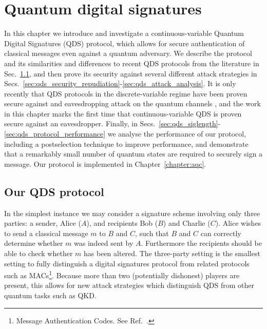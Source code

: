 %

\chapter{Quantum digital signatures}\label{chapter:qds}


In this chapter we introduce and investigate a continuous-variable Quantum Digital Signatures (QDS) protocol, which allows for secure authentication of classical messages even against a quantum adversary. We describe the protocol and its similarities and differences to recent QDS protocols from the literature in Sec.~\ref{sec:qds_protocol}, and then prove its security against several different attack strategies in Secs.~\ref{sec:qds_security_repudiation}-\ref{sec:qds_attack_analysis}. It is only recently that QDS protocols in the discrete-variable regime have been proven secure against and eavesdropping attack on the quantum channels \cite{Amiri2016, Yin2016}, and the work in this chapter marks the first time that continuous-variable QDS is proven secure against an eavesdropper. Finally, in Secs.~\ref{sec:qds_siglength}-\ref{sec:qds_protocol_performance} we analyse the performance of our protocol, including a postselection technique to improve performance, and demonstrate that a remarkably small number of quantum states are required to securely sign a message. Our protocol is implemented in Chapter~\ref{chapter:aqc}.

\section{Our QDS protocol}\label{sec:qds_protocol}

In the simplest instance we may consider a signature scheme involving only three parties: a sender, Alice ($A$), and recipients Bob ($B$) and Charlie ($C$). Alice wishes to send a classical message $m$ to $B$ and $C$, such that $B$ and $C$ can correctly determine whether $m$ was indeed sent by $A$. Furthermore the recipients should be able to check whether $m$ has been altered. The three-party setting is the smallest setting to fully distinguish a digital signatures protocol from related protocols such as MACs\footnote{Message Authentication Codes. See Ref.~\cite{Schneier1996}.}. Because more than two (potentially dishonest) players are present, this allows for new attack strategies which distinguish QDS from other quantum tasks such as QKD.

